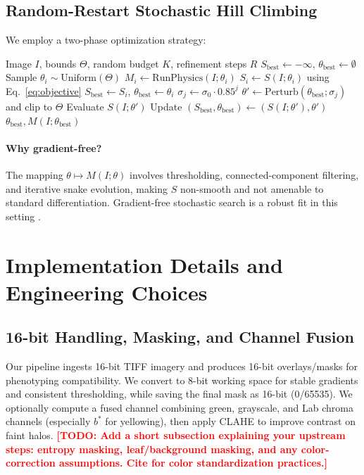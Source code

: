 \documentclass[journal]{IEEEtran}
\newcommand{\TODO}[1]{\textcolor{red}{\textbf{[TODO: #1]}}}
\begin{document}
\subsection{Random-Restart Stochastic Hill Climbing}
We employ a two-phase optimization strategy:
\begin{algorithm}
\caption{Stochastic Parameter Optimization (per image)}
\begin{algorithmic}[1]
\REQUIRE Image $I$, bounds $\Theta$, random budget $K$, refinement steps $R$
\STATE $S_{\mathrm{best}} \leftarrow -\infty$, $\theta_{\mathrm{best}}\leftarrow \emptyset$
    \STATE Sample $\theta_i \sim \mathrm{Uniform}(\Theta)$
    \STATE $M_i \leftarrow \mathrm{RunPhysics}(I;\theta_i)$
    \STATE $S_i \leftarrow S(I;\theta_i)$ using Eq.~\eqref{eq:objective}
        \STATE $S_{\mathrm{best}}\leftarrow S_i$, $\theta_{\mathrm{best}}\leftarrow \theta_i$
    \ENDIF
\ENDFOR
{}
    \STATE $\sigma_j \leftarrow \sigma_0 \cdot 0.85^j$ 
    \STATE $\theta' \leftarrow \mathrm{Perturb}(\theta_{\mathrm{best}};\sigma_j)$ and clip to $\Theta$
    \STATE Evaluate $S(I;\theta')$
        \STATE Update $(S_{\mathrm{best}},\theta_{\mathrm{best}})\leftarrow (S(I;\theta'),\theta')$
    \ENDIF
\ENDFOR
\RETURN $\theta_{\mathrm{best}}, M(I;\theta_{\mathrm{best}})$
\end{algorithmic}
\end{algorithm}

\paragraph{Why gradient-free?}
The mapping $\theta \mapsto M(I;\theta)$ involves thresholding, connected-component filtering, and iterative snake evolution, making $S$ non-smooth and not amenable to standard differentiation. Gradient-free stochastic search is a robust fit in this setting \cite{yu2020hyperparam}.

\section{Implementation Details and Engineering Choices}

\subsection{16-bit Handling, Masking, and Channel Fusion}
Our pipeline ingests 16-bit TIFF imagery and produces 16-bit overlays/masks for phenotyping compatibility.
We convert to 8-bit working space for stable gradients and consistent thresholding, while saving the final mask as 16-bit (0/65535).
We optionally compute a fused channel combining green, grayscale, and Lab chroma channels (especially $b^\ast$ for yellowing), then apply CLAHE to improve contrast on faint halos.
\TODO{Add a short subsection explaining your upstream steps: entropy masking, leaf/background masking, and any color-correction assumptions. Cite \cite{berry2018color} for color standardization practices.}
\end{document}

